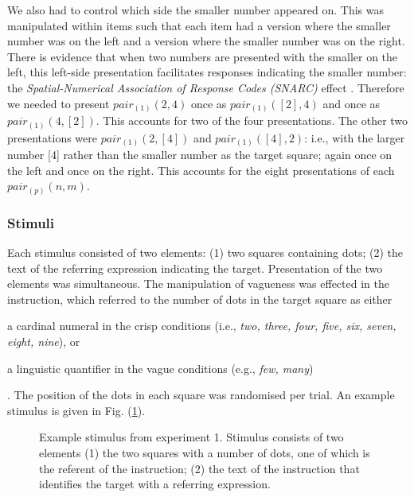 \documentclass[doc,floatmark]{apa}
\begin{document}
We also had to control which side the smaller number appeared on. This was manipulated within items such that each item had a version where the smaller number was on the left and a version where the smaller number was on the right. There is evidence  that when two numbers are presented with the smaller on the left, this left-side presentation facilitates responses indicating the smaller number: the \emph{Spatial-Numerical Association of Response Codes (SNARC)} effect \cite{dehaene1993mental, gevers2006automatic}. Therefore we needed to present $pair_{(1)}(2,4)$ once as $pair_{(1)}([2],4)$ and once as $pair_{(1)}(4,[2])$. This accounts for two of the four presentations. The other two presentations were $pair_{(1)}(2,[4])$ and $pair_{(1)}([4],2)$: i.e., with the larger number [4] rather than the smaller number as the target square; again once on the left and once on the right. This accounts for the eight presentations of each $pair_{(p)}(n,m)$.

\subsubsection{Stimuli}
Each stimulus consisted of two elements: (1) two squares containing dots; (2) the text of the referring expression indicating the target. Presentation of the two elements was simultaneous. The manipulation of vagueness was effected in the instruction, which referred to the number of dots in the target square as either \begin{seriate} \item a cardinal numeral in the crisp conditions (i.e., \emph{two, three, four, five, six, seven, eight, nine}), or \item a linguistic quantifier in the vague conditions (e.g., \emph{few, many}) \end{seriate}. The position of the dots in each square was randomised per trial. An example stimulus is given in Fig. (\ref{stime1}).

\begin{figure}[tbp]
\caption{Example stimulus from experiment 1. Stimulus consists of two elements (1) the two squares with a number of dots, one of which is the referent of the instruction; (2) the text of the instruction that identifies the target with a referring expression.}
\label{stime1}
\end{figure}
\end{document}
